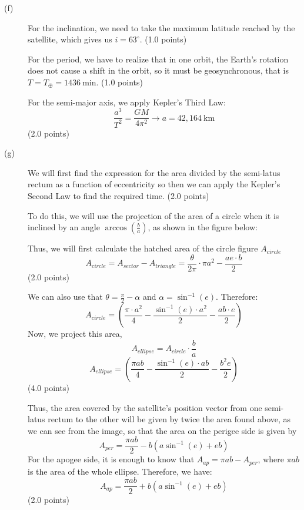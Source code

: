\begin{description}
\item[(f)] For the inclination, we need to take the maximum latitude reached
  by the satellite, which gives us $\boxed{i = 63^\circ}$.
  \hfill(1.0 points)

  For the period, we have to realize that in one orbit, the Earth's rotation
  does not cause a shift in the orbit, so it must be geosynchronous, that is
  $T = T_\oplus = \boxed{1436\ \mathrm{min}}$. \hfill(1.0 points)

  For the semi-major axis, we apply Kepler's Third Law:
  \[
    \frac{a^3}{T^2} = \frac{GM}{4\pi^2}
    \rightarrow \boxed{a = 42{,}164\ \mathrm{km}}
  \]
  \hfill(2.0 points)

\item[(g)] We will first find the expression for the area divided by the
  semi-latus rectum as a function of eccentricity so then we can apply the
  Kepler's Second Law to find the required time. \hfill(2.0 points)

  To do this, we will use the projection of the area of a circle when it is
  inclined by an angle $\arccos\left(\frac{b}{a}\right)$, as shown in the
  figure below:


  Thus, we will first calculate the hatched area of the circle figure
  $A_{circle}$
  \[
    A_{circle} = A_{sector} - A_{triangle}
      = \frac{\theta}{2\pi}\cdot\pi a^2 - \frac{ae\cdot b}{2}
  \]
  \hfill(2.0 points)

  We can also use that $\theta = \frac{\pi}{2} - \alpha$ and
  $\alpha = \sin^{-1}(e)$. Therefore:
  \[
    A_{circle} = \left(\frac{\pi\cdot a^2}{4}
      - \frac{\sin^{-1}(e)\cdot a^2}{2} - \frac{ab\cdot e}{2}\right)
  \]
  Now, we project this area,
  \[
    A_{ellipse} = A_{circle}\cdot\frac{b}{a}
  \]
  \[
    A_{ellipse} = \left(\frac{\pi ab}{4}
      - \frac{\sin^{-1}(e)\cdot ab}{2} - \frac{b^2 e}{2}\right)
  \]
  \hfill(4.0 points)

  Thus, the area covered by the satellite's position vector from one
  semi-latus rectum to the other will be given by twice the area found above,
  as we can see from the image, so that the area on the perigee side is given
  by
  \[
    A_{per} = \frac{\pi ab}{2} - b(a\sin^{-1}(e) + eb)
  \]
  For the apogee side, it is enough to know that
  $A_{ap} = \pi ab - A_{per}$, where $\pi ab$ is the area of the whole
  ellipse. Therefore, we have:
  \[
    A_{ap} = \frac{\pi ab}{2} + b\left(a\sin^{-1}(e) + eb\right)
  \]
  \hfill(2.0 points)


\end{description}
